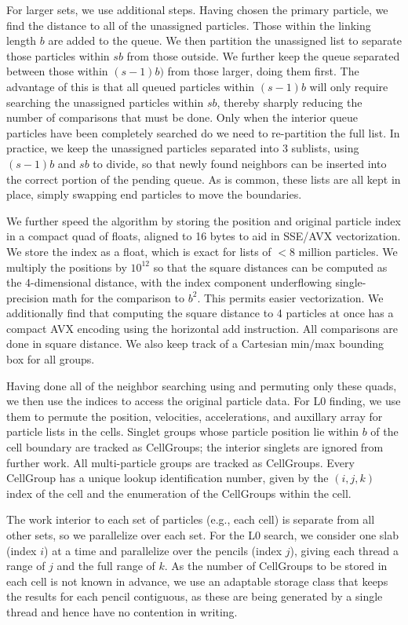 For larger sets, we use additional steps.  Having chosen the primary
particle, we find the distance to all of the unassigned particles.
Those within the linking length $b$ are added to the queue.  We then
partition the unassigned list to separate those particles within 
$sb$ from those outside.  We further keep the queue separated between
those within $(s-1)b)$ from those larger, doing them first.  The
advantage of this is that all queued particles within $(s-1)b$ will
only require searching the unassigned particles within $sb$, thereby
sharply reducing the number of comparisons that must be done.  Only
when the interior queue particles have been completely searched do
we need to re-partition the full list.  In practice, we keep the 
unassigned particles separated into 3 sublists, using $(s-1)b$ and
$sb$ to divide, so that newly found neighbors can be inserted into 
the correct portion of the pending queue.  As is common, these 
lists are all kept in place, simply swapping end particles to move
the boundaries.

We further speed the algorithm by storing the position and original
particle index in a compact quad of floats, aligned to 16 bytes to
aid in SSE/AVX vectorization.  We store the index as a float, which
is exact for lists of $<$8 million particles.  We multiply the
positions by $10^{12}$ so that the square distances can be computed
as the 4-dimensional distance, with the index component underflowing
single-precision math for the comparison to $b^2$.  This permits
easier vectorization.  We additionally find that computing the
square distance to 4 particles at once has a compact AVX encoding
using the horizontal add instruction.  All comparisons are done in
square distance.  We also keep track of a Cartesian min/max bounding
box for all groups.

Having done all of the neighbor searching using and permuting only
these quads, we then use the indices to access the original particle
data.  For L0 finding, we use them to permute the position, velocities,
accelerations, and auxillary array for particle lists in the cells.
Singlet groups whose particle position lie within $b$ of the cell
boundary are tracked as CellGroups; the interior singlets are ignored
from further work.  All multi-particle groups are tracked as
CellGroups.  Every CellGroup has a unique lookup identification
number, given by the $(i,j,k)$ index of the cell and the enumeration
of the CellGroups within the cell.

The work interior to each set of particles (e.g., each cell) is 
separate from all other sets, so we parallelize over each set.
For the L0 search, we consider one slab (index $i$) at a time and 
parallelize over the pencils (index $j$), giving each thread a
range of $j$ and the full range of $k$.  As the number of CellGroups
to be stored in each cell is not known in advance, we use an adaptable
storage class that keeps the results for each pencil contiguous, as 
these are being generated by a single thread and hence have no
contention in writing.



